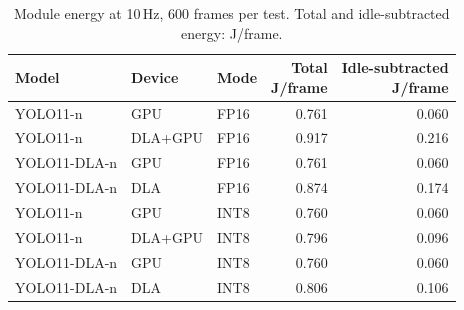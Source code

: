 \begin{table}[t]
\caption{Module energy at 10\,Hz, 600 frames per test. Total and idle-subtracted energy: J/frame.}
\label{tab:energy}\centering\footnotesize
\setlength{\tabcolsep}{3pt}
\begin{tabular*}{\columnwidth}{@{\extracolsep{\fill}}lllrr@{}}
\toprule
Model & Device & Mode & \shortstack{Total\\J/frame} & \shortstack{Idle-subtracted\\J/frame} \\
\midrule
YOLO11-n & GPU & FP16 & 0.761 & 0.060 \\
YOLO11-n & DLA+GPU & FP16 & 0.917 & 0.216 \\
YOLO11-DLA-n & GPU & FP16 & 0.761 & 0.060 \\
YOLO11-DLA-n & DLA & FP16 & 0.874 & 0.174 \\
\midrule
YOLO11-n & GPU & INT8 & 0.760 & 0.060 \\
YOLO11-n & DLA+GPU & INT8 & 0.796 & 0.096 \\
YOLO11-DLA-n & GPU & INT8 & 0.760 & 0.060 \\
YOLO11-DLA-n & DLA & INT8 & 0.806 & 0.106 \\
\bottomrule
\end{tabular*}
\end{table}
